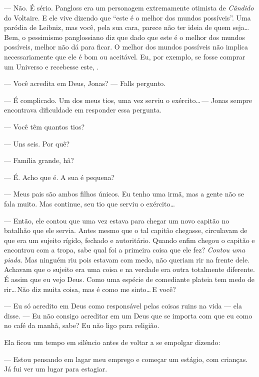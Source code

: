 --- Não. É sério. Pangloss era um personagem extremamente otimista de \emph{Cândido}\mudanca{,} do Voltaire. E ele vive dizendo que ``este é o melhor dos mundos possíveis''. Uma paródia de Leibniz, mas você, pela sua cara, parece não ter ideia de quem seja\ldots\,Bem, o pessimismo panglossiano diz que dado que este é o melhor dos mundos possíveis, melhor não dá para ficar. O melhor dos mundos possíveis não implica necessariamente que ele é bom ou aceitável. Eu, por exemplo, se fosse comprar um Universo e recebesse este, .

--- Você acredita em Deus, Jonas? --- Falls pergunto.

--- É complicado. Um dos meus tios, uma vez\mudanca{,} serviu o exército\ldots\,--- Jonas sempre encontrava dificuldade em responder essa pergunta.

--- Você têm quantos tios?

--- Uns seis. Por quê?

--- Família grande, hã?

--- É. Acho que é. A sua é pequena?

--- Meus pais são ambos filhos únicos. Eu tenho uma irmã, mas a gente não se fala muito. Mas continue, seu tio que serviu o exército\ldots

--- Então, ele contou que uma vez estava para chegar um novo capitão no batalhão  que ele servia. Antes mesmo que o tal capitão chegasse, circulavam  de que era um sujeito rígido, fechado e autoritário. Quando\mudanca{,} enfim\mudanca{,} chegou o capitão e encontrou com a tropa, sabe qual foi a primeira coisa que ele fez? \emph{Contou uma piada}. Mas ninguém riu\mudanca{,} pois estavam com medo, não queriam rir na frente dele. Achavam que o sujeito era uma coisa e na verdade era outra\mudanca{,} totalmente diferente. É assim que eu vejo Deus. Como uma espécie de comediante  plateia tem medo de rir\ldots\,Não diz muita coisa, mas é como me sinto\ldots\,E você?

--- Eu só acredito em Deus como responsável pelas coisas ruins na vida ---  ela disse. --- Eu não consigo acreditar em um Deus que se importa com que eu como no café da manhã, sabe? Eu não ligo para religião.

Ela ficou um tempo em silêncio\mudanca{,} antes de voltar a se empolgar dizendo:

--- Estou pensando em lagar meu emprego e começar um estágio, com crianças. Já fui ver um lugar para estagiar.

